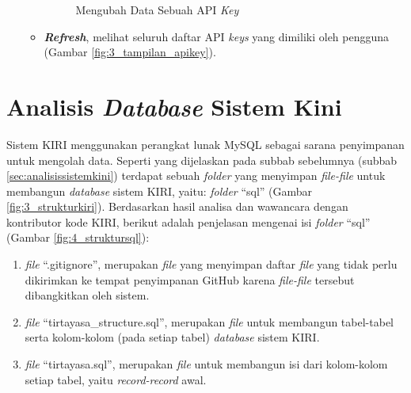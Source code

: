 \begin{enumerate}
\begin{itemize}
\begin{figure}[htbp]
			\caption{Mengubah Data Sebuah API \textit{Key}}
			\label{fig:3_tampilan_editapikey}
		\end{figure}
		\item \textbf{\textit{Refresh}}, melihat seluruh daftar API \textit{keys} yang dimiliki oleh pengguna (Gambar \ref{fig:3_tampilan_apikey}).
	\end{itemize}
	
\end{enumerate}


\section{Analisis \textit{Database} Sistem Kini}
\label{sec:analisisdatabasesistemkini}
Sistem KIRI menggunakan perangkat lunak MySQL sebagai sarana penyimpanan untuk mengolah data. Seperti yang dijelaskan pada subbab sebelumnya (subbab \ref{sec:analisissistemkini}) terdapat sebuah \textit{folder} yang menyimpan \textit{file-file} untuk membangun \textit{database} sistem KIRI, yaitu: \textit{folder} ``sql'' (Gambar \ref{fig:3_strukturkiri}). Berdasarkan hasil analisa dan wawancara dengan kontributor kode KIRI, berikut adalah penjelasan mengenai isi \textit{folder} ``sql'' (Gambar \ref{fig:4_struktursql}):
\begin{enumerate}
	\item \textit{file} ``.gitignore'', merupakan \textit{file} yang menyimpan daftar \textit{file} yang tidak perlu dikirimkan ke tempat penyimpanan GitHub karena \textit{file-file} tersebut dibangkitkan oleh sistem.
	\item \textit{file} ``tirtayasa\_structure.sql'', merupakan \textit{file} untuk membangun tabel-tabel serta kolom-kolom (pada setiap tabel) \textit{database} sistem KIRI.
	\item \textit{file} ``tirtayasa.sql'', merupakan \textit{file} untuk membangun isi dari kolom-kolom setiap tabel, yaitu \textit{record-record} awal.
\end{enumerate}

